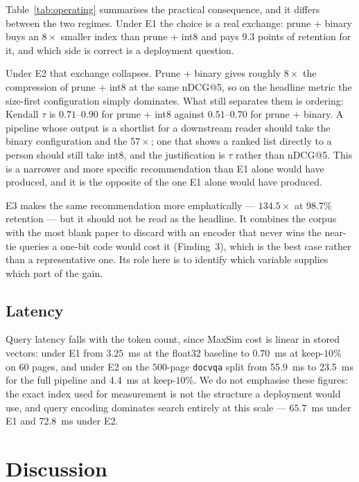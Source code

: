 \documentclass[conference]{IEEEtran}
\begin{document}
Table~\ref{tab:operating} summarises the practical consequence, and it differs
between the two regimes. Under E1 the choice is a real exchange: prune + binary
buys an $8\times$ smaller index than prune + int8 and pays $9.3$ points of
retention for it, and which side is correct is a deployment question.

Under E2 that exchange collapses. Prune + binary gives roughly $8\times$ the
compression of prune + int8 at the same nDCG@5, so on the headline metric the
size-first configuration simply dominates. What still separates them is ordering:
Kendall $\tau$ is $0.71$--$0.90$ for prune + int8 against $0.51$--$0.70$ for
prune + binary. A pipeline whose output is a shortlist for a downstream reader should
take the binary configuration and the $57\times$; one that shows a ranked list
directly to a person should still take int8, and the justification is $\tau$
rather than nDCG@5. This is a narrower and more specific recommendation than E1
alone would have produced, and it is the opposite of the one E1 alone would have
produced.

E3 makes the same recommendation more emphatically --- $134.5\times$ at $98.7\%$
retention --- but it should not be read as the headline. It combines the
corpus with the most blank paper to discard with an encoder that never wins the
near-tie queries a one-bit code would cost it (Finding~3), which is the best
case rather than a representative one. Its role here is to identify which
variable supplies which part of the gain.

\subsection{Latency}
Query latency falls with the token count, since MaxSim cost is linear in stored
vectors: under E1 from $3.25$~ms at the float32 baseline to $0.70$~ms at
keep-$10\%$ on $60$ pages, and under E2 on the $500$-page \texttt{docvqa} split
from 55.9~ms to 23.5~ms for the full pipeline and 4.4~ms at keep-$10\%$. We
do not emphasise these figures: the exact index used for measurement is not the
structure a deployment would use, and query encoding dominates search entirely at
this scale --- $65.7$~ms under E1 and 72.8~ms under E2.

\section{Discussion}
\end{document}
